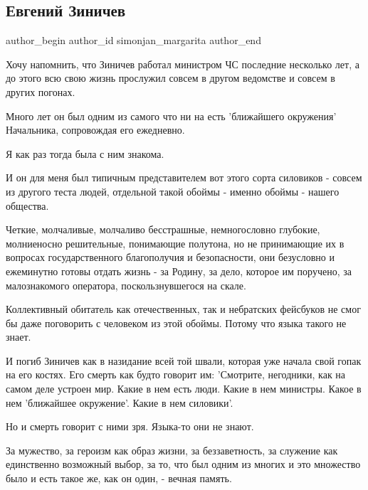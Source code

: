  
 
 
 
 
 
\subsection{Евгений Зиничев}
\label{sec:08_09_2021.fb.simonjan_margarita.1.zinichev_smert}
 
\ifcmt
 author_begin
   author_id simonjan_margarita
 author_end
\fi

Хочу напомнить, что Зиничев работал министром ЧС последние несколько лет, а до
этого всю свою жизнь прослужил совсем в другом ведомстве и совсем в других
погонах. 

Много лет он был одним из самого что ни на есть 'ближайшего окружения'
Начальника, сопровождая его ежедневно. 

Я как раз тогда была с ним знакома. 

И он для меня был типичным представителем вот этого сорта силовиков - совсем из
другого теста людей, отдельной такой обоймы - именно обоймы - нашего общества. 

Четкие, молчаливые, молчаливо бесстрашные, немногословно глубокие, молниеносно
решительные, понимающие полутона, но не принимающие их в вопросах
государственного благополучия и безопасности, они безусловно и ежеминутно
готовы отдать жизнь - за Родину, за дело, которое им поручено, за малознакомого
оператора, поскользнувшегося на скале. 

Коллективный обитатель как отечественных, так и небратских фейсбуков не смог бы
даже поговорить с человеком из этой обоймы. Потому что языка такого не знает. 

И погиб Зиничев как в назидание всей той швали, которая уже начала свой гопак
на его костях. Его смерть как будто говорит им: 'Смотрите, негодники, как на
самом деле устроен мир. Какие в нем есть люди. Какие в нем министры. Какое в
нем 'ближайшее окружение'. Какие в нем силовики'. 

Но и смерть говорит с ними зря. Языка-то они не знают.  

За мужество, за героизм как образ жизни, за беззаветность, за служение как
единственно возможный выбор, за то, что был одним из многих и это множество
было и есть такое же, как он один, - вечная память.

